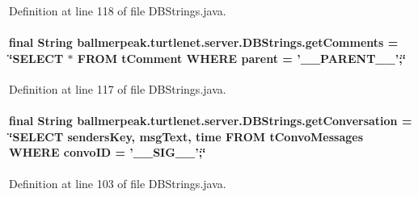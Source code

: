 Definition at line 118 of file D\-B\-Strings.\-java.

\hypertarget{classballmerpeak_1_1turtlenet_1_1server_1_1DBStrings_a1576b88412e7eac8188422b2f9945cd4}{
\paragraph[{get\-Comments}]{\setlength{\rightskip}{0pt plus 5cm}final String ballmerpeak.\-turtlenet.\-server.\-D\-B\-Strings.\-get\-Comments = \char`\"{}S\-E\-L\-E\-C\-T $\ast$ F\-R\-O\-M t\-Comment W\-H\-E\-R\-E parent = '\-\_\-\-\_\-\-P\-A\-R\-E\-N\-T\-\_\-\-\_\-';\char`\"{}\hspace{0.3cm}{\ttfamily [static]}}}\label{classballmerpeak_1_1turtlenet_1_1server_1_1DBStrings_a1576b88412e7eac8188422b2f9945cd4}


Definition at line 117 of file D\-B\-Strings.\-java.

\hypertarget{classballmerpeak_1_1turtlenet_1_1server_1_1DBStrings_a764e619962ecc020606b3f8b2f3068dd}{
\paragraph[{get\-Conversation}]{\setlength{\rightskip}{0pt plus 5cm}final String ballmerpeak.\-turtlenet.\-server.\-D\-B\-Strings.\-get\-Conversation = \char`\"{}S\-E\-L\-E\-C\-T senders\-Key, msg\-Text, time F\-R\-O\-M t\-Convo\-Messages W\-H\-E\-R\-E convo\-I\-D = '\-\_\-\-\_\-\-S\-I\-G\-\_\-\-\_\-';\char`\"{}\hspace{0.3cm}{\ttfamily [static]}}}\label{classballmerpeak_1_1turtlenet_1_1server_1_1DBStrings_a764e619962ecc020606b3f8b2f3068dd}


Definition at line 103 of file D\-B\-Strings.\-java.

